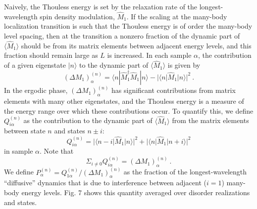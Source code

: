 \documentclass[letterpaper, twocolumn,superscriptaddress, showpacs,preprintnumbers,amsmath,amssymb]{revtex4}
\begin{document}
Naively, the Thouless energy is set by the relaxation rate of the longest-wavelength
spin density modulation, $\hat M_1$.  If the scaling at the many-body localization transition
is such that the Thouless energy is of order the many-body level spacing, then
at the transition a nonzero fraction of the dynamic
part of $\langle\hat M_1\rangle$ should be from its matrix elements between
adjacent energy levels, and this fraction should remain large as $L$ is
increased.  In each sample $\alpha$, the contribution of a given eigenstate $|n\rangle$
to the dynamic part of $\langle\hat M_1\rangle$ is given by
\begin{equation}
(\Delta M_1)_{\alpha}^{(n)}=\langle n|\hat{M}_1^{\dagger}\hat{M}_1|n\rangle - |\langle n|\hat{M}_1|n\rangle|^2~.
\end{equation}
In the ergodic phase, $(\Delta M_1)_{\alpha}^{(n)}$ has significant contributions from matrix elements
with many other eigenstates, and the Thouless energy is a measure of the energy range over which these
contributions occur.  %
To quantify this, we define $Q_{i\alpha}^{(n)}$ as the contribution to the dynamic part of $\langle\hat M_1\rangle$
from the matrix elements between state $n$ and states $n\pm i$: %
\begin{equation}
Q_{i\alpha}^{(n)} = |\langle n-i|\hat{M}_1|n\rangle|^2 + |\langle n|\hat{M}_1|n+i\rangle|^2
\end{equation}
in sample $\alpha$.  Note that
\begin{equation}
\Sigma_{i\neq0} Q_{i\alpha}^{(n)} = (\Delta M_1)_{\alpha}^{(n)}~.
\end{equation}
We define $P_{\alpha}^{(n)}=Q_{1\alpha}^{(n)}/(\Delta M_1)_{\alpha}^{(n)}$ as the fraction of the longest-wavelength ``diffusive''
 dynamics that is due to interference between adjacent ($i=1$) many-body energy levels.
 Fig. 7 shows this quantity averaged over disorder realizations and states. %
\end{document}
